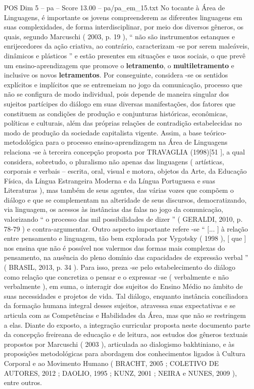 \begin{textsample}{POS Dim 5 – pa – Score 13.00 – pa/pa\_em\_15.txt}
No tocante à Área de Linguagens, é importante os jovens compreenderem as diferentes linguagens em suas complexidades, de forma interdisciplinar, por meio dos diversos gêneros, os quais, segundo Marcuschi ( 2003, p. 19 ), “ não são instrumentos estanques e enrijecedores da ação criativa, ao contrário, caracterizam -se por serem maleáveis, dinâmicos e plásticos ” e estão presentes em situações e usos sociais, o que prevê um ensino-aprendizagem que promove o \textbf{letramento}, o \textbf{multiletramento} e inclusive os novos \textbf{letramentos}.
Por conseguinte, considera -se os sentidos explícitos e implícitos que se entremeiam no jogo da comunicação, processo que não se configura de modo individual, pois depende de maneira singular dos sujeitos partícipes do diálogo em suas diversas manifestações, dos fatores que constituem as condições de produção e conjunturas históricas, econômicas, políticas e culturais, além das próprias relações de contradição estabelecidas no modo de produção da sociedade capitalista vigente.
Assim, a base teórico-metodológica para o processo ensino-aprendizagem na Área de Linguagens relaciona -se à terceira concepção proposta por TRAVAGLIA (1998)[51 ], a qual considera, sobretudo, o pluralismo não apenas das linguagens ( artísticas, corporais e verbais – escrita, oral, visual e motora, objetos da Arte, da Educação Física, da Língua Estrangeira Moderna e da Língua Portuguesa e suas Literaturas ), mas também de seus agentes, das várias vozes que compõem o diálogo e que se complementam na alteridade de seus discursos, democratizando, via linguagem, os acessos às instâncias das falas no jogo da comunicação, valorizando “ o processo das mil possibilidades de dizer ” ( GERALDI, 2010, p. 78-79 ) e contra-argumentar.
Outro aspecto importante refere -se “ [... ] à relação entre pensamento e linguagem, tão bem explorada por Vygotsky ( 1998 ), [ que ] nos ensina que não é possível nos valermos das formas mais complexas do pensamento, na ausência do pleno domínio das capacidades de expressão verbal ” ( BRASIL, 2013, p. 34 ).
Para isso, preza -se pelo estabelecimento do diálogo como relação que concretiza o pensar e o expressar -se ( verbalmente e não verbalmente ), em suma, o interagir dos sujeitos do Ensino Médio no âmbito de suas necessidades e projetos de vida.
Tal diálogo, enquanto instância conciliadora da formação humana integral desses sujeitos, atravessa suas expectativas e se articula com as Competências e Habilidades da Área, mas que não se restringem a elas.
Diante do exposto, a integração curricular proposta neste documento parte da concepção freireana de educação e de leitura, aos estudos dos gêneros textuais propostos por Marcuschi ( 2003 ), articulada ao dialogismo bakhtiniano, e às proposições metodológicas para abordagem dos conhecimentos ligados à Cultura Corporal e ao Movimento Humano ( BRACHT, 2005 ; COLETIVO DE AUTORES, 2012 ; DAOLIO, 1995 ; KUNZ, 2001 ; NEIRA e NUNES, 2009 ), entre outros.

\end{textsample}
